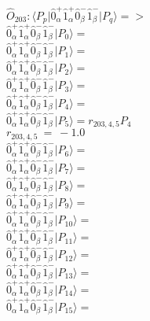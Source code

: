 \documentclass[14pt]{article}
\begin{document}
    $\hat{O}_{203}:  \langle{P_p}\vert \hat{0}_{\alpha}^{+}\hat{1}_{\alpha}^{+}\hat{0}_{\beta}^{-}\hat{1}_{\beta}^{-} \vert{P_q}\rangle => $ \\ 
    $ \hat{0}_{\alpha}^{+}\hat{1}_{\alpha}^{+}\hat{0}_{\beta}^{-}\hat{1}_{\beta}^{-} \vert{P_{0}}\rangle =  $ \\ 
    $ \hat{0}_{\alpha}^{+}\hat{1}_{\alpha}^{+}\hat{0}_{\beta}^{-}\hat{1}_{\beta}^{-} \vert{P_{1}}\rangle =  $ \\ 
    $ \hat{0}_{\alpha}^{+}\hat{1}_{\alpha}^{+}\hat{0}_{\beta}^{-}\hat{1}_{\beta}^{-} \vert{P_{2}}\rangle =  $ \\ 
    $ \hat{0}_{\alpha}^{+}\hat{1}_{\alpha}^{+}\hat{0}_{\beta}^{-}\hat{1}_{\beta}^{-} \vert{P_{3}}\rangle =  $ \\ 
    $ \hat{0}_{\alpha}^{+}\hat{1}_{\alpha}^{+}\hat{0}_{\beta}^{-}\hat{1}_{\beta}^{-} \vert{P_{4}}\rangle =  $ \\ 
    $ \hat{0}_{\alpha}^{+}\hat{1}_{\alpha}^{+}\hat{0}_{\beta}^{-}\hat{1}_{\beta}^{-} \vert{P_{5}}\rangle = {r}_{203,4,5}P_{4} $ \\ 
    ${r}_{203,4,5}\ =\ -1.0 $ \\ 
    $ \hat{0}_{\alpha}^{+}\hat{1}_{\alpha}^{+}\hat{0}_{\beta}^{-}\hat{1}_{\beta}^{-} \vert{P_{6}}\rangle =  $ \\ 
    $ \hat{0}_{\alpha}^{+}\hat{1}_{\alpha}^{+}\hat{0}_{\beta}^{-}\hat{1}_{\beta}^{-} \vert{P_{7}}\rangle =  $ \\ 
    $ \hat{0}_{\alpha}^{+}\hat{1}_{\alpha}^{+}\hat{0}_{\beta}^{-}\hat{1}_{\beta}^{-} \vert{P_{8}}\rangle =  $ \\ 
    $ \hat{0}_{\alpha}^{+}\hat{1}_{\alpha}^{+}\hat{0}_{\beta}^{-}\hat{1}_{\beta}^{-} \vert{P_{9}}\rangle =  $ \\ 
    $ \hat{0}_{\alpha}^{+}\hat{1}_{\alpha}^{+}\hat{0}_{\beta}^{-}\hat{1}_{\beta}^{-} \vert{P_{10}}\rangle =  $ \\ 
    $ \hat{0}_{\alpha}^{+}\hat{1}_{\alpha}^{+}\hat{0}_{\beta}^{-}\hat{1}_{\beta}^{-} \vert{P_{11}}\rangle =  $ \\ 
    $ \hat{0}_{\alpha}^{+}\hat{1}_{\alpha}^{+}\hat{0}_{\beta}^{-}\hat{1}_{\beta}^{-} \vert{P_{12}}\rangle =  $ \\ 
    $ \hat{0}_{\alpha}^{+}\hat{1}_{\alpha}^{+}\hat{0}_{\beta}^{-}\hat{1}_{\beta}^{-} \vert{P_{13}}\rangle =  $ \\ 
    $ \hat{0}_{\alpha}^{+}\hat{1}_{\alpha}^{+}\hat{0}_{\beta}^{-}\hat{1}_{\beta}^{-} \vert{P_{14}}\rangle =  $ \\ 
    $ \hat{0}_{\alpha}^{+}\hat{1}_{\alpha}^{+}\hat{0}_{\beta}^{-}\hat{1}_{\beta}^{-} \vert{P_{15}}\rangle =  $ \\ 
    
\end{document}
